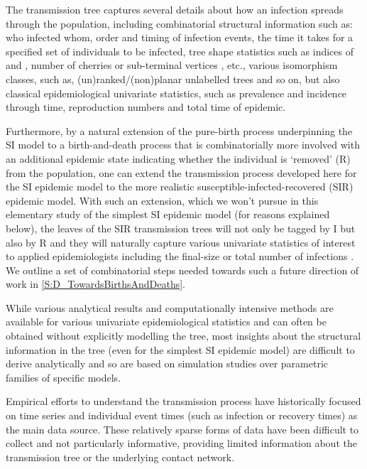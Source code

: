 \documentclass[review]{elsarticle}
\numberwithin{equation}{section}
\let\orgautoref\autoref
\renewcommand{\autoref}
        {\def\equationautorefname{Eq.}%
         \def\figureautorefname{Fig.}%
         \def\subfigureautorefname{Fig.}%
         \def\sectionautorefname{Sect.}%
         \def\subsectionautorefname{Sect.}%
         \def\subsubsectionautorefname{Sect.}%
         \def\Itemautorefname{item}%
         \def\tableautorefname{Table}%
         \def\propositionautorefname{Prop.}%
         \def\corollaryautorefname{Corollary}%
         \def\theoremautorefname{Theorem}%
         \def\remarkautorefname{Remark}%
         \def\lemmaautorefname{Lemma}%
         \def\proofofautorefname{Proof}%
         \def\exampleautorefname{Example}%
         \orgautoref}
\begin{document}
The transmission tree captures several details about how an infection spreads through the population, including combinatorial structural information such as:
who infected whom,
order and timing of infection events,
the time it takes for a specified set of individuals to be infected,
tree shape statistics such as indices of \cite{Sackin1975} and \cite{Colless1982}, number of cherries or sub-terminal vertices \citep{McKenzie2000}, etc.,
various isomorphism classes, such as, (un)ranked/(non)planar unlabelled trees and so on, 
but also classical epidemiological univariate statistics, such as prevalence and incidence through time, reproduction numbers and total time of epidemic.  

Furthermore, by a natural extension of the pure-birth process underpinning the SI model to a birth-and-death process that is combinatorially more involved with an additional epidemic state indicating whether the individual is `removed' (R) from the population, one can extend the transmission process developed here for the SI epidemic model to the more realistic susceptible-infected-recovered (SIR) epidemic model.  
With such an extension, which we won't pursue in this elementary study of the simplest SI epidemic model (for reasons explained below), the leaves of the SIR transmission trees will not only be tagged by I but also by R and they will naturally capture various univariate statistics of interest to applied epidemiologists including the final-size or total number of infections \citep{Ludwig1975,Pellis2008,House2012}.  
We outline a set of combinatorial steps needed towards such a future direction of work in \autoref{S:D_TowardsBirthsAndDeaths}.

While various analytical results \citep[eg.][]{andersson2000} and computationally intensive methods \citep[eg.][]{House2012} are available for various univariate epidemiological statistics and can often be obtained without explicitly modelling the tree, most insights about the structural information in the tree (even for the simplest SI epidemic model) are difficult to derive analytically and so are based on simulation studies over parametric families of specific models.  

Empirical efforts to understand the transmission process have historically focused on time series and individual event times (such as infection or recovery times) as the main data source.  
These relatively sparse forms of data have been difficult to collect and not particularly informative, providing limited  information about the transmission tree \citep[but see][]{haydon2003, wallinga2004} or the underlying contact network.  
\end{document}
